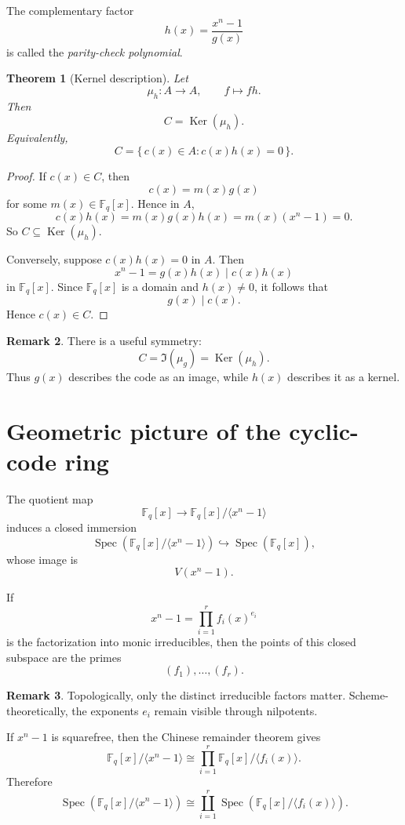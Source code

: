 \documentclass[11pt]{article}
\newtheorem{theorem}{Theorem}[section]
\theoremstyle{definition}
\newtheorem{remark}[theorem]{Remark}
\newcommand{\F}{\mathbb{F}}
\newcommand{\Spec}{\operatorname{Spec}}
\newcommand{\Ker}{\operatorname{Ker}}
\newcommand{\ideal}[1]{\langle #1\rangle}
\begin{document}
	The complementary factor
	\[
	h(x)=\frac{x^n-1}{g(x)}
	\]
	is called the \emph{parity-check polynomial}.
	
	\begin{theorem}[Kernel description]\label{thm:parity-check}
		Let
		\[
		\mu_h:A\to A,
		\qquad
		f\mapsto fh.
		\]
		Then
		\[
		C=\Ker(\mu_h).
		\]
		Equivalently,
		\[
		C=\{\,c(x)\in A : c(x)h(x)=0\,\}.
		\]
	\end{theorem}
	
	\begin{proof}
		If \(c(x)\in C\), then
		\[
		c(x)=m(x)g(x)
		\]
		for some \(m(x)\in \F_q[x]\). Hence in \(A\),
		\[
		c(x)h(x)=m(x)g(x)h(x)=m(x)(x^n-1)=0.
		\]
		So \(C\subseteq \Ker(\mu_h)\).
		
		Conversely, suppose \(c(x)h(x)=0\) in \(A\). Then
		\[
		x^n-1=g(x)h(x)\mid c(x)h(x)
		\]
		in \(\F_q[x]\). Since \(\F_q[x]\) is a domain and \(h(x)\neq 0\), it follows that
		\[
		g(x)\mid c(x).
		\]
		Hence \(c(x)\in C\).
	\end{proof}
	
	\begin{remark}
		There is a useful symmetry:
		\[
		C=\Im(\mu_g)=\Ker(\mu_h).
		\]
		Thus \(g(x)\) describes the code as an image, while \(h(x)\) describes it as a kernel.
	\end{remark}
	
	\section{Geometric picture of the cyclic-code ring}
	
	The quotient map
	\[
	\F_q[x]\to \F_q[x]/\ideal{x^n-1}
	\]
	induces a closed immersion
	\[
	\Spec\!\left(\F_q[x]/\ideal{x^n-1}\right)\hookrightarrow \Spec(\F_q[x]),
	\]
	whose image is
	\[
	V(x^n-1).
	\]
	
	If
	\[
	x^n-1=\prod_{i=1}^r f_i(x)^{e_i}
	\]
	is the factorization into monic irreducibles, then the points of this closed subspace are the primes
	\[
	(f_1),\dots,(f_r).
	\]
	
	\begin{remark}
		Topologically, only the distinct irreducible factors matter. Scheme-theoretically, the exponents \(e_i\) remain visible through nilpotents.
	\end{remark}
	
	If \(x^n-1\) is squarefree, then the Chinese remainder theorem gives
	\[
	\F_q[x]/\ideal{x^n-1}
	\cong
	\prod_{i=1}^r \F_q[x]/\ideal{f_i(x)}.
	\]
	Therefore
	\[
	\Spec\!\left(\F_q[x]/\ideal{x^n-1}\right)
	\cong
	\coprod_{i=1}^r \Spec\!\left(\F_q[x]/\ideal{f_i(x)}\right).
	\]
	
\end{document}
